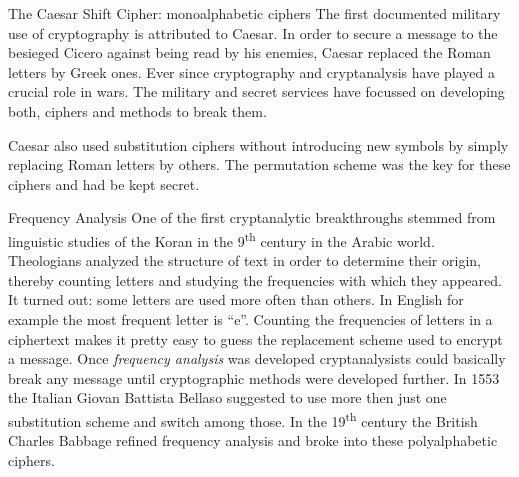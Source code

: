 \documentclass[final,hyperref={pdfpagelabels=false}]{beamer}
\begin{document}
\begin{frame}{}
\begin{columns}[t]
\begin{column}{.3\linewidth}
        \begin{block}{The Caesar Shift Cipher: monoalphabetic ciphers}
          The first documented military use of cryptography is attributed to Caesar. In order to secure a message to the besieged Cicero against being read by his enemies, Caesar replaced the Roman letters by Greek ones. Ever since cryptography and cryptanalysis have played a crucial role in wars. The military and secret services have focussed on developing both, ciphers and methods to break them. \par
          Caesar also used substitution ciphers without introducing new symbols by simply replacing Roman letters by others. The permutation scheme was the key for these ciphers and had be kept secret.
        \end{block}

        \begin{block}{Frequency Analysis}
          One of the first cryptanalytic breakthroughs stemmed from linguistic studies of the Koran in the 9\textsuperscript{th} century in the Arabic world. Theologians analyzed the structure of text in order to determine their origin, thereby counting letters and studying the frequencies with which they appeared. It turned out: some letters are used more often than others. In English for example the most frequent letter is ``e''. Counting the frequencies of letters in a ciphertext makes it pretty easy to guess the replacement scheme used to encrypt a message. Once {\em frequency analysis} was developed cryptanalysists could basically break any message until cryptographic methods were developed further. In 1553 the Italian Giovan Battista Bellaso suggested to use more then just one substitution scheme and switch among those. In the 19\textsuperscript{th} century the British Charles Babbage refined frequency analysis and broke into these polyalphabetic ciphers.
        \end{block}


\end{column}
\end{columns}
\end{frame}
\end{document}
